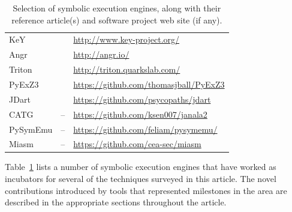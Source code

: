 \begin{table}[t]
\begin{adjustbox}{width=0.98\columnwidth}
\begin{tabular}{| l || c || l |}
    {\sc KeY} & \cite{HBR-RV14} & \url{http://www.key-project.org/} \\
    {\sc Angr} & \cite{FIRMALICE-NDSS15,ANGR-SSP16} & \url{http://angr.io/} \\
    {\sc Triton} & \cite{TRITON-SSTIC15} & \url{http://triton.quarkslab.com/} \\
    {\sc PyExZ3} & \cite{BD-TECH15} & \url{https://github.com/thomasjball/PyExZ3} \\
    {\sc JDart} & \cite{JDART-TACAS16} & \url{https://github.com/psycopaths/jdart} \\

    {\sc CATG} & -- & \url{https://github.com/ksen007/janala2} \\
    {\sc PySymEmu} & -- & \url{https://github.com/feliam/pysymemu/} \\
    {\sc Miasm} & -- & \url{https://github.com/cea-sec/miasm} \\
    
    \hline  
  \end{tabular}
  \end{adjustbox}
  \caption{Selection of symbolic execution engines, along with their reference article(s) and software project web site (if any).}
  \label{tab:symbolic-engines}
  \vspace{-3mm} %
\end{table}

Table~\ref{tab:symbolic-engines} lists a number of symbolic execution engines that have worked as incubators for several of the techniques surveyed in this article. The novel contributions introduced by tools that represented milestones in the area are described in the appropriate sections throughout the article.

